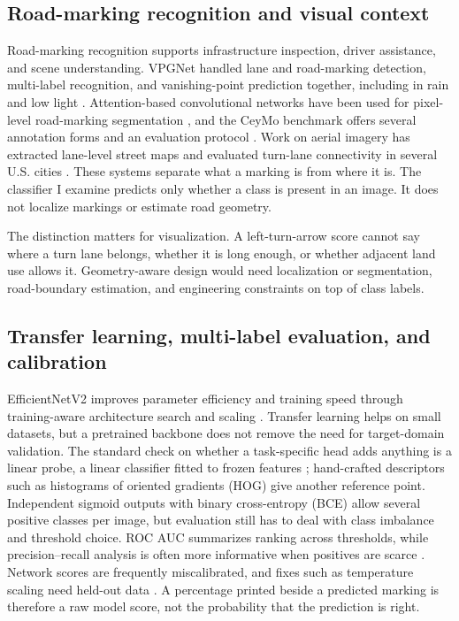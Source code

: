 \documentclass[11pt]{article}
\begin{document}
\subsection{Road-marking recognition and visual context}
Road-marking recognition supports infrastructure inspection, driver assistance, and scene understanding. VPGNet handled lane and road-marking detection, multi-label recognition, and vanishing-point prediction together, including in rain and low light \citep{lee2017}. Attention-based convolutional networks have been used for pixel-level road-marking segmentation \citep{wu2022}, and the CeyMo benchmark offers several annotation forms and an evaluation protocol \citep{jayasinghe2022}. Work on aerial imagery has extracted lane-level street maps and evaluated turn-lane connectivity in several U.S. cities \citep{he2022}. These systems separate what a marking is from where it is. The classifier I examine predicts only whether a class is present in an image. It does not localize markings or estimate road geometry.

The distinction matters for visualization. A left-turn-arrow score cannot say where a turn lane belongs, whether it is long enough, or whether adjacent land use allows it. Geometry-aware design would need localization or segmentation, road-boundary estimation, and engineering constraints on top of class labels.

\subsection{Transfer learning, multi-label evaluation, and calibration}
EfficientNetV2 improves parameter efficiency and training speed through training-aware architecture search and scaling \citep{tan2021}. Transfer learning helps on small datasets, but a pretrained backbone does not remove the need for target-domain validation. The standard check on whether a task-specific head adds anything is a linear probe, a linear classifier fitted to frozen features \citep{alain2017}; hand-crafted descriptors such as histograms of oriented gradients (HOG) \citep{dalal2005} give another reference point. Independent sigmoid outputs with binary cross-entropy (BCE) allow several positive classes per image, but evaluation still has to deal with class imbalance and threshold choice. ROC AUC summarizes ranking across thresholds, while precision--recall analysis is often more informative when positives are scarce \citep{saito2015}. Network scores are frequently miscalibrated, and fixes such as temperature scaling need held-out data \citep{guo2017}. A percentage printed beside a predicted marking is therefore a raw model score, not the probability that the prediction is right.
\end{document}
